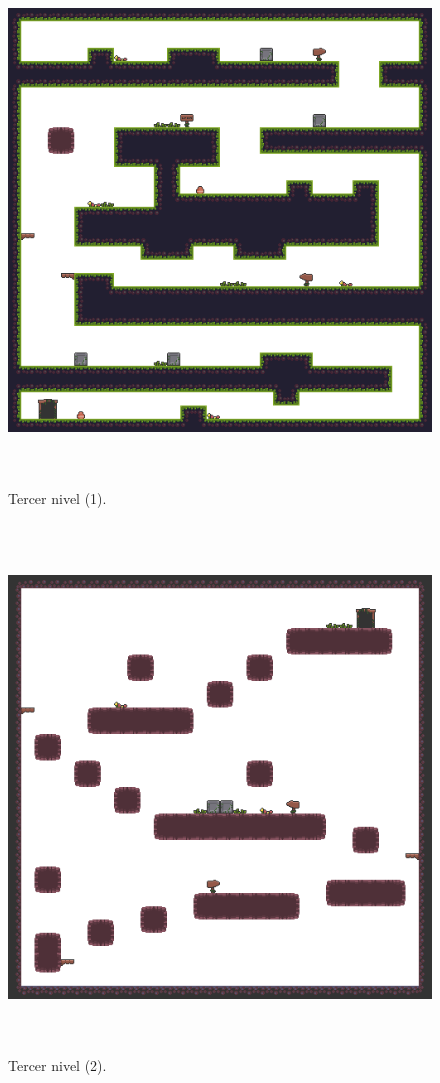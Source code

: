 \begin{figure}[h]
	\centering
	\includegraphics[height=14cm]{capitulos/apendice/level_3_0.png}
	\caption{Tercer nivel (1).}\label{fig:ap_lvl_3_0}
\end{figure}

\begin{figure}[h]
	\centering
	\includegraphics[height=14cm]{capitulos/apendice/level_3_1.png}
	\caption{Tercer nivel (2).}\label{fig:ap_lvl_3_1}
\end{figure}
\FloatBarrier{}

